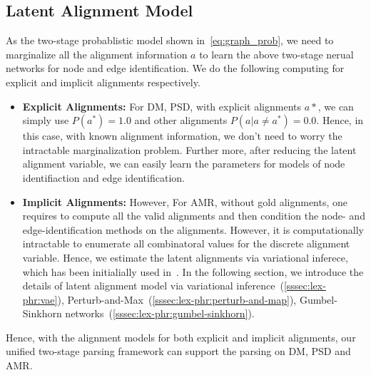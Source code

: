 \subsection{Latent Alignment Model}
\label{ssec:lex-phr:latent-alignment}

As the two-stage probablistic model shown
in~\autoref{eq:graph_prob}, we need to marginalize all the
alignment information $a$ to learn the above two-stage nerual networks
for node and edge identification. We do the following computing for
explicit and implicit alignments respectively.
\begin{itemize}
\item \textbf{Explicit Alignments:} For DM, PSD, with explicit
  alignments $a*$, we can simply use $P(a^{*}) = 1.0$ and other
  alignments $P(a | a \neq a^{*}) = 0.0 $. Hence, in this case, with
  known alignment information, we don't need to worry the intractable
  marginalization problem. Further more, after reducing the latent
  alignment variable, we can easily learn the parameters for models of
  node identifiaction and edge identification.
\item \textbf{Implicit Alignments:} However, For AMR, without gold
  alignments, one requires to compute all the valid alignments and
  then condition the node- and edge-identification methods on the
  alignments.  However, it is computationally intractable to enumerate
  all combinatoral values for the discrete alignment variable. Hence,
  we estimate the latent alignments via variational inferece, which
  has been initialially used in~\citet{lyu2018amr}. In the following
  section, we introduce the details of latent alignment model via
  variational inference~(\autoref{sssec:lex-phr:vae}),
  Perturb-and-Max~(\autoref{sssec:lex-phr:perturb-and-map}), Gumbel-Sinkhorn
  networks~(\autoref{sssec:lex-phr:gumbel-sinkhorn}).
\end{itemize}

Hence, with the alignment models for both explicit and implicit
alignments, our unified two-stage parsing framework can support the
parsing on DM, PSD and AMR.

